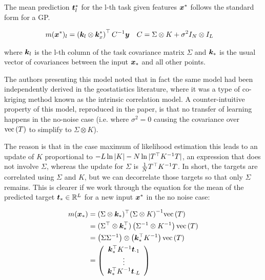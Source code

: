 The mean prediction $\bm t_l^*$ for the l-th task given features $\bm x^*$ follows the standard form for a GP.

\begin{align}
m(\bm x^*)_l & = \left(\bm k_l \otimes \bm k_x^* \right)^\top{C}^{-1} \bm y & C & = \Sigma \otimes K + \sigma^2 I_N \otimes I_L
\end{align}

where $\bm k_l$ is the l-th column of the task covariance matrix $\Sigma$ and $\bm k_*$ is the usual vector of covariances between the input $\bm x_*$ and all other points.

The authors presenting this model noted that in fact the same model had been independently derived in the geostatistics literature, where it was a type of co-kriging method known as the intrinsic correlation model\cite{Wackernagel1998}. A counter-intuitive property of this model, reproduced in the paper, is that no transfer of learning happens in the no-noise case (i.e. where $\sigma^2 = 0$ causing the covariance over $\text{vec}\left(T\right)$ to simplify to $\Sigma \otimes K$). 

The reason is that in the case maximum of likelihood estimation this leads to an update of $K$ proportional to $-L \ln |K| - N \ln |T^\top {K}^{-1} T|$, an expression that does not involve $\Sigma$, whereas the update for $\Sigma$ is $\frac{1}{N}T^\top {K}^{-1} T$. In short, the targets are correlated using $\Sigma$ and $K$, but we can decorrelate those targets so that only $\Sigma$ remains. This is clearer if we work through the equation for the mean of the predicted target $\bm t_* \in { \mathbb{R}^{L} }$ for a new input $\bm x^*$ in the no noise case:

\begin{align}
m(\bm x_*) & = (\Sigma \otimes \bm k_*)^\top{\left( \Sigma \otimes K \right)}^{-1}\text{vec}\left(T\right) \\
& = (\Sigma^\top \otimes \bm k_*^\top)\left({\Sigma}^{-1} \otimes {K}^{-1}\right)\text{vec}\left(T\right)\\
& = \left(\Sigma {\Sigma}^{-1} \right) \otimes \left(\bm k_*^\top {K}^{-1}\right)\text{vec}\left(T\right) \\
& = \left( \begin{array}{c}
     \bm k_*^\top {K}^{-1} \bm t_{\cdot 1} \\
     \vdots \\
     \bm k_*^\top {K}^{-1} \bm t_{\cdot L} \\
 \end{array}\right) \\
\end{align}

